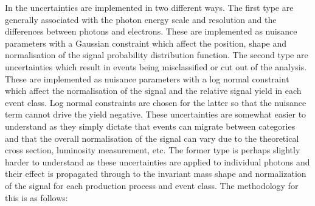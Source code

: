 In the \MFM uncertainties are implemented in two different ways. The first type are generally associated with the photon energy scale and resolution and the differences between photons and electrons. These are implemented as nuisance parameters with a Gaussian constraint which affect the position, shape and normalisation of the signal probability distribution function. The second type are uncertainties which result in events being misclassified or cut out of the analysis. These are implemented as nuisance parameters with a log normal constraint which affect the normalisation of the signal and the relative signal yield in each event class. Log normal constraints are chosen for the latter so that the nuisance term cannot drive the yield negative. These uncertainties are somewhat easier to understand as they simply dictate that events can migrate between categories and that the overall normalisation of the signal can vary due to the theoretical cross section, luminosity measurement, etc. The former type is perhaps slightly harder to understand as these uncertainties are applied to individual photons and their effect is propagated through to the invariant mass shape and normalization of the signal for each production process and event class. The methodology for this is as follows:

